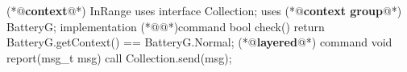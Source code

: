 \begin{Sbox}
\begin{minipage}{\columnwidth}
\begin{csource}
(*@\textbf{context}@*) InRange {
  uses interface Collection;
  uses (*@\textbf{context group}@*) BatteryG; 
}implementation {
 (*@@*)command bool check(){
    return BatteryG.getContext() == BatteryG.Normal;}
 (*@\textbf{layered}@*) command void report(msg_t msg){
    call Collection.send(msg);}}
\end{csource}
\end{minipage}
\end{Sbox}